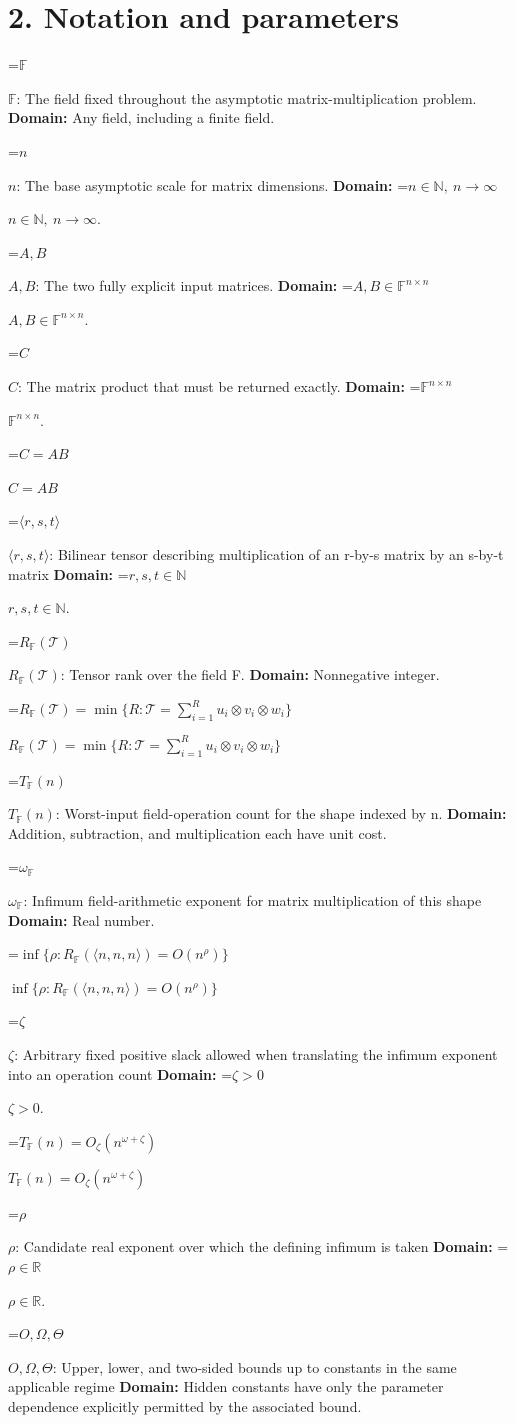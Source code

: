 \documentclass[10pt,a4paper]{article}
\newcommand{\AtlasMath}[1]{\par\begingroup\centering\setbox0=\hbox{$\displaystyle #1$}\ifdim\wd0>1.4\linewidth\typeout{ATLAS WIDE FORMULA: \the\wd0}\fi\ifdim\wd0>\linewidth\resizebox{\linewidth}{!}{\box0}\else\box0\fi\par\endgroup}
\newcommand{\AtlasInlineMath}[1]{\begingroup\setbox0=\hbox{$#1$}\ifdim\wd0>.4\linewidth\endgroup\AtlasMath{#1}\else\endgroup$#1$\fi}
\begin{document}
\section{2. Notation and parameters}
\AtlasInlineMath{\mathbb F}: The field fixed throughout the asymptotic matrix-multiplication problem. \textbf{Domain:} Any field, including a finite field.

\AtlasInlineMath{n}: The base asymptotic scale for matrix dimensions. \textbf{Domain:} \AtlasInlineMath{n\in\mathbb N,\ n\to\infty}.

\AtlasInlineMath{A,B}: The two fully explicit input matrices. \textbf{Domain:} \AtlasInlineMath{A,B\in\mathbb F^{n\times n}}.

\AtlasInlineMath{C}: The matrix product that must be returned exactly. \textbf{Domain:} \AtlasInlineMath{\mathbb F^{n\times n}}.

\AtlasInlineMath{C=AB}

\AtlasInlineMath{\langle r,s,t\rangle}: Bilinear tensor describing multiplication of an r-by-s matrix by an s-by-t matrix \textbf{Domain:} \AtlasInlineMath{r,s,t\in\mathbb N}.

\AtlasInlineMath{R_{\mathbb F}(\mathcal T)}: Tensor rank over the field F. \textbf{Domain:} Nonnegative integer.

\AtlasInlineMath{R_{\mathbb F}(\mathcal T)=\min\{R:\mathcal T=\sum_{i=1}^{R}u_i\otimes v_i\otimes w_i\}}

\AtlasInlineMath{T_{\mathbb F}(n)}: Worst-input field-operation count for the shape indexed by n. \textbf{Domain:} Addition, subtraction, and multiplication each have unit cost.

\AtlasInlineMath{\omega_{\mathbb F}}: Infimum field-arithmetic exponent for matrix multiplication of this shape \textbf{Domain:} Real number.

\AtlasInlineMath{\inf\{\rho:R_{\mathbb F}(\langle n,n,n\rangle)=O(n^\rho)\}}

\AtlasInlineMath{\zeta}: Arbitrary fixed positive slack allowed when translating the infimum exponent into an operation count \textbf{Domain:} \AtlasInlineMath{\zeta>0}.

\AtlasInlineMath{T_{\mathbb F}(n)=O_\zeta(n^{\omega+\zeta})}

\AtlasInlineMath{\rho}: Candidate real exponent over which the defining infimum is taken \textbf{Domain:} \AtlasInlineMath{\rho\in\mathbb R}.

\AtlasInlineMath{O,\Omega,\Theta}: Upper, lower, and two-sided bounds up to constants in the same applicable regime \textbf{Domain:} Hidden constants have only the parameter dependence explicitly permitted by the associated bound.
\end{document}
